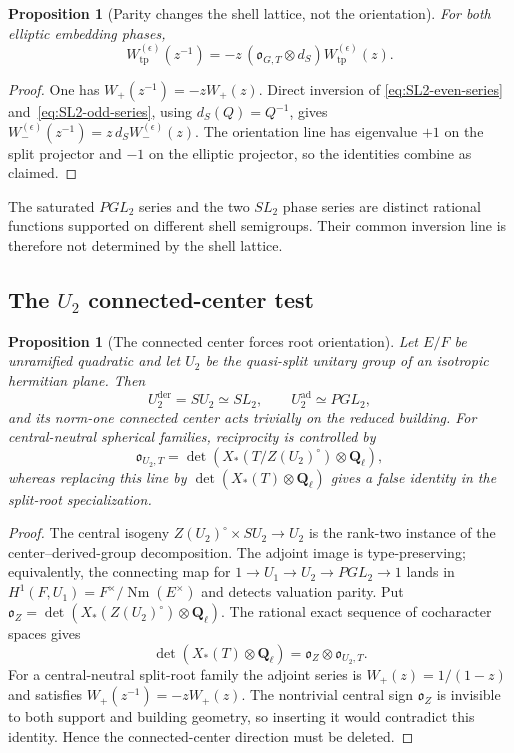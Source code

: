 \documentclass[11pt]{article}
\newtheorem{proposition}[theorem]{Proposition}
\theoremstyle{definition}
\theoremstyle{remark}
\newcommand{\Qell}{\mathbf Q_\ell}
\newcommand{\ad}{\mathrm{ad}}
\newcommand{\der}{\mathrm{der}}
\newcommand{\Nm}{\operatorname{Nm}}
\begin{document}
\begin{proposition}[Parity changes the shell lattice, not the orientation]
\label{prop:SL2-parity-reciprocity}
For both elliptic embedding phases,
\begin{equation}
 W_{\mathrm{tp}}^{(\epsilon)}(z^{-1})
 =-z\,(\mathfrak o_{G,T}\otimes d_S)
 W_{\mathrm{tp}}^{(\epsilon)}(z).
 \label{eq:SL2-parity-reciprocity}
\end{equation}
\end{proposition}

\begin{proof}
One has $W_+(z^{-1})=-zW_+(z)$.  Direct inversion of
\eqref{eq:SL2-even-series} and~\eqref{eq:SL2-odd-series}, using
$d_S(Q)=Q^{-1}$, gives
$W_-^{(\epsilon)}(z^{-1})=z\,d_SW_-^{(\epsilon)}(z)$.  The orientation line
has eigenvalue $+1$ on the split projector and $-1$ on the elliptic
projector, so the identities combine as claimed.
\end{proof}

The saturated $PGL_2$ series and the two $SL_2$ phase series are distinct
rational functions supported on different shell semigroups.  Their common
inversion line is therefore not determined by the shell lattice.

\subsection{The \texorpdfstring{$U_2$}{U2} connected-center test}

\begin{proposition}[The connected center forces root orientation]
\label{prop:U2-center-test}
Let $E/F$ be unramified quadratic and let $U_2$ be the quasi-split unitary
group of an isotropic hermitian plane.  Then
\[
 U_2^{\der}=SU_2\simeq SL_2,\qquad U_2^{\ad}\simeq PGL_2,
\]
and its norm-one connected center acts trivially on the reduced building.
For central-neutral spherical families, reciprocity is controlled by
\[
 \mathfrak o_{U_2,T}
 =\det\!\left(X_*(T/Z(U_2)^\circ)\otimes\Qell\right),
\]
whereas replacing this line by $\det(X_*(T)\otimes\Qell)$ gives a false
identity in the split-root specialization.
\end{proposition}

\begin{proof}
The central isogeny
$Z(U_2)^\circ\times SU_2\to U_2$ is the rank-two instance of the
center--derived-group decomposition.  The adjoint image is type-preserving;
equivalently, the connecting map for
$1\to U_1\to U_2\to PGL_2\to1$ lands in
$H^1(F,U_1)=F^\times/\Nm(E^\times)$ and detects valuation parity.  Put
$\mathfrak o_Z=\det(X_*(Z(U_2)^\circ)\otimes\Qell)$.  The rational exact
sequence of cocharacter spaces gives
\[
 \det(X_*(T)\otimes\Qell)
 =\mathfrak o_Z\otimes\mathfrak o_{U_2,T}.
\]
For a central-neutral split-root family the adjoint series is
$W_+(z)=1/(1-z)$ and satisfies $W_+(z^{-1})=-zW_+(z)$.  The nontrivial
central sign $\mathfrak o_Z$ is invisible to both support and building
geometry, so inserting it would contradict this identity.  Hence the
connected-center direction must be deleted.
\end{proof}
\end{document}

